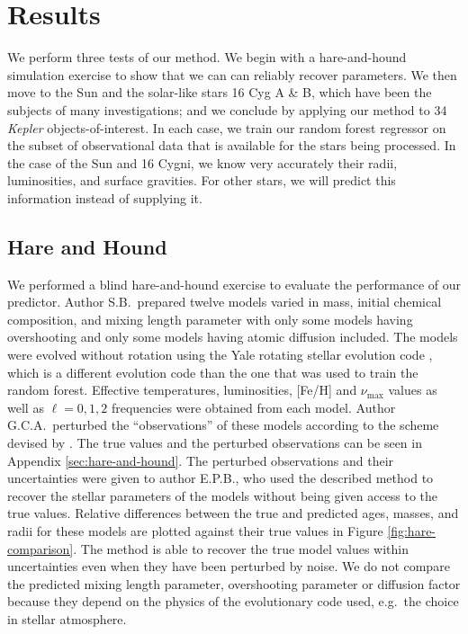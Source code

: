 \documentclass[manuscript,linenumbers]{aastex6}
\begin{document}


\section{Results}
We perform three tests of our method. We begin with a hare-and-hound simulation exercise to show that we can can reliably recover parameters. We then move to the Sun and the solar-like stars 16 Cyg A \& B, which have been the subjects of many investigations; and we conclude by applying our method to 34 \emph{Kepler} objects-of-interest. In each case, we train our random forest regressor on the subset of observational data that is available for the stars being processed. In the case of the Sun and 16 Cygni, we know very accurately their radii, luminosities, and surface gravities. For other stars, we will predict this information instead of supplying it. 


\subsection{Hare and Hound} 
We performed a blind hare-and-hound exercise to evaluate the performance of our predictor. Author S.B.\ prepared twelve models varied in mass, initial chemical composition, and mixing length parameter with only some models having overshooting and only some models having atomic diffusion included. The models were evolved without rotation using the Yale rotating stellar evolution code \citep[YREC;][]{2008ApSS.316...31D}, which is a different evolution code than the one that was used to train the random forest. Effective temperatures, luminosities, [Fe/H] and $\nu_{\max}$ values as well as $\ell=0,1,2$ frequencies were obtained from each model. Author G.C.A.\  perturbed the ``observations'' of these models according to the scheme devised by \citet{spaceinn}. The true values and the perturbed observations can be seen in Appendix \ref{sec:hare-and-hound}. The perturbed observations and their uncertainties were given to author E.P.B.\@, who used the described method to recover the stellar parameters of the models without being given access to the true values. Relative differences between the true and predicted ages, masses, and radii for these models are plotted against their true values in Figure \ref{fig:hare-comparison}. The method is able to recover the true model values within uncertainties even when they have been perturbed by noise. We do not compare the predicted mixing length parameter, overshooting parameter or diffusion factor because they depend on the physics of the evolutionary code used, e.g.\ the choice in stellar atmosphere. 
\end{document}
